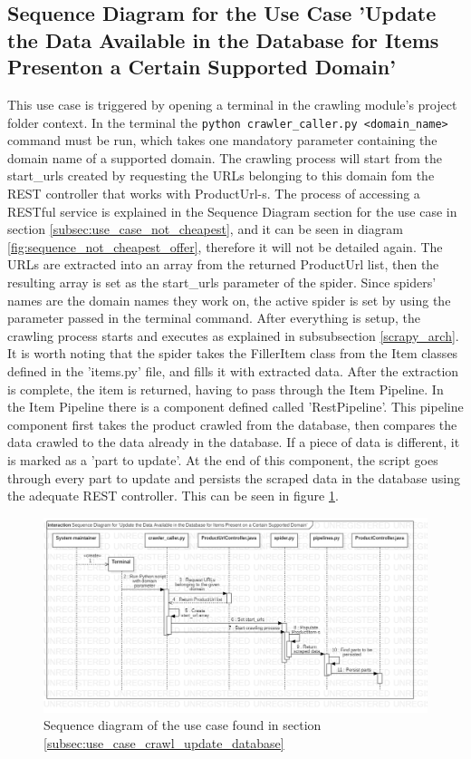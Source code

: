 \documentclass[12pt,a4paper,twoside]{report}
\begin{document}
\subsection{Sequence Diagram for the Use Case 'Update the Data Available in the Database for Items Presenton a Certain Supported Domain'}

This use case is triggered by opening a terminal in the crawling module's project folder context. In the terminal the \lstinline$python crawler_caller.py <domain_name>$ command must be run, which takes one mandatory parameter containing the domain name of a supported domain. The crawling process will start from the start\_urls created by requesting the URLs belonging to this domain fom the REST controller that works with ProductUrl-s. The process of accessing a RESTful service is explained in the Sequence Diagram section for the use case in section \ref{subsec:use_case_not_cheapest}, and it can be seen in diagram \ref{fig:sequence_not_cheapest_offer}, therefore it will not be detailed again. The URLs are extracted into an array from the returned ProductUrl list, then the resulting array is set as the start\_urls parameter of the spider. Since spiders' names are the domain names they work on, the active spider is set by using the parameter passed in the terminal command. After everything is setup, the crawling process starts and executes as explained in subsubsection \ref{scrapy_arch}. It is worth noting that the spider takes the FillerItem class from the Item classes defined in the 'items.py' file, and fills it with extracted data. After the extraction is complete, the item is returned, having to pass through the Item Pipeline. In the Item Pipeline there is a component defined called 'RestPipeline'. This pipeline component first takes the product crawled from the database, then compares the data crawled to the data already in the database. If a piece of data is different, it is marked as a 'part to update'. At the end of this component, the script goes through every part to update and persists the scraped data in the database using the adequate REST controller. This can be seen in figure \ref{fig:sequence_crawl_update_database}.

\begin{figure}[ht]
  \centering
  \includegraphics[width=\linewidth]{img/sequence_crawl_update_database.png}
  \caption{Sequence diagram of the use case found in section \ref{subsec:use_case_crawl_update_database}}
  \label{fig:sequence_crawl_update_database}
\end{figure}
\end{document}
